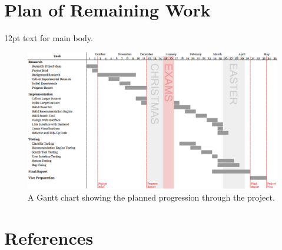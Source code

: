 \documentclass[12pt,a4paper]{article}
\begin{document}
\section{Plan of Remaining Work}
12pt text for main body.
\pagebreak

\begin{landscape}
    \begin{figure}
        \centering
        \includegraphics[height=0.85\textwidth]{gantt.png}
        \caption{A Gantt chart showing the planned progression through the project.}
    \end{figure}
\end{landscape}
\restoregeometry

\setcounter{secnumdepth}{0}
\section{References}
\printbibliography[heading=none]
\end{document}
